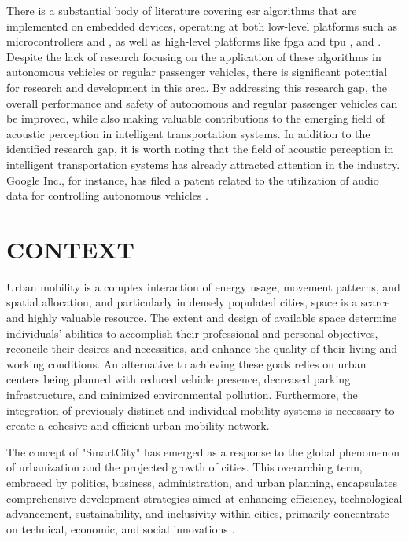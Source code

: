 There is a substantial body of literature covering \gls{esr} algorithms that are implemented on embedded devices, operating at both low-level platforms such as microcontrollers \cite{Abreha2014} and \cite{Nordby2019}, as well as high-level platforms like \gls{fpga} and \gls{tpu} \cite{Silva2019}, \cite{Vandendriessche2021} and \cite{Lhoest2021}. Despite the lack of research focusing on the application of these algorithms in autonomous vehicles or regular passenger vehicles, there is significant potential for research and development in this area. By addressing this research gap, the overall performance and safety of autonomous and regular passenger vehicles can be improved, while also making valuable contributions to the emerging field of acoustic perception in intelligent transportation systems. In addition to the identified research gap, it is worth noting that the field of acoustic perception in intelligent transportation systems has already attracted attention in the industry. Google Inc., for instance, has filed a patent related to the utilization of audio data for controlling autonomous vehicles \cite{Ferguson2014}.


\section{CONTEXT}
\label{sec:introduction_context}

Urban mobility is a complex interaction of energy usage, movement patterns, and spatial allocation, and particularly in densely populated cities, space is a scarce and highly valuable resource. The extent and design of available space determine individuals' abilities to accomplish their professional and personal objectives, reconcile their desires and necessities, and enhance the quality of their living and working conditions. An alternative to achieving these goals relies on urban centers being planned with reduced vehicle presence, decreased parking infrastructure, and minimized environmental pollution. Furthermore, the integration of previously distinct and individual mobility systems is necessary to create a cohesive and efficient urban mobility network.

The concept of "SmartCity" has emerged as a response to the global phenomenon of urbanization and the projected growth of cities. This overarching term, embraced by politics, business, administration, and urban planning, encapsulates comprehensive development strategies aimed at enhancing efficiency, technological advancement, sustainability, and inclusivity within cities, primarily concentrate on technical, economic, and social innovations \cite{EDAG2020}.

